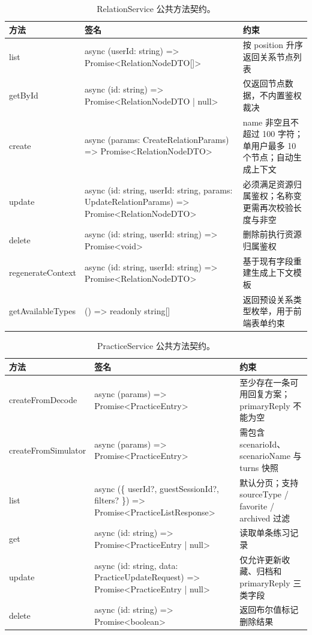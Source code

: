 \begin{table}[H]
  \centering
  \caption{RelationService 公共方法契约。}
  \label{tab:relation-service-contract}
  \begin{tabularx}{\textwidth}{>{\raggedright\arraybackslash}p{3.2cm} >{\raggedright\arraybackslash}X >{\raggedright\arraybackslash}p{3.5cm}}
    \toprule
    方法 & 签名 & 约束 \\
    \midrule
    list & async (userId: string) => Promise<RelationNodeDTO[]> & 按 position 升序返回关系节点列表 \\
    getById & async (id: string) => Promise<RelationNodeDTO | null> & 仅返回节点数据，不内置鉴权裁决 \\
    create & async (params: CreateRelationParams) => Promise<RelationNodeDTO> & name 非空且不超过 100 字符；单用户最多 10 个节点；自动生成上下文 \\
    update & async (id: string, userId: string, params: UpdateRelationParams) => Promise<RelationNodeDTO> & 必须满足资源归属鉴权；名称变更需再次校验长度与非空 \\
    delete & async (id: string, userId: string) => Promise<void> & 删除前执行资源归属鉴权 \\
    regenerateContext & async (id: string, userId: string) => Promise<RelationNodeDTO> & 基于现有字段重建生成上下文模板 \\
    getAvailableTypes & () => readonly string[] & 返回预设关系类型枚举，用于前端表单约束 \\
    \bottomrule
  \end{tabularx}
\end{table}

\begin{table}[H]
  \centering
  \caption{PracticeService 公共方法契约。}
  \label{tab:practice-service-contract}
  \begin{tabularx}{\textwidth}{>{\raggedright\arraybackslash}p{3.2cm} >{\raggedright\arraybackslash}X >{\raggedright\arraybackslash}p{3.5cm}}
    \toprule
    方法 & 签名 & 约束 \\
    \midrule
    createFromDecode & async (params) => Promise<PracticeEntry> & 至少存在一条可用回复方案；primaryReply 不能为空 \\
    createFromSimulator & async (params) => Promise<PracticeEntry> & 需包含 scenarioId、scenarioName 与 turns 快照 \\
    list & async (\{ userId?, guestSessionId?, filters? \}) => Promise<PracticeListResponse> & 默认分页；支持 sourceType / favorite / archived 过滤 \\
    get & async (id: string) => Promise<PracticeEntry | null> & 读取单条练习记录 \\
    update & async (id: string, data: PracticeUpdateRequest) => Promise<PracticeEntry | null> & 仅允许更新收藏、归档和 primaryReply 三类字段 \\
    delete & async (id: string) => Promise<boolean> & 返回布尔值标记删除结果 \\
    \bottomrule
  \end{tabularx}
\end{table}


